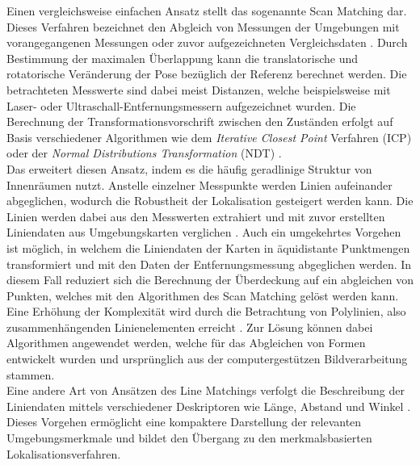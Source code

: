 Einen vergleichsweise einfachen Ansatz stellt das sogenannte Scan Matching  dar. Dieses Verfahren bezeichnet den Abgleich \red[(Matching)] von Messungen der Umgebungen mit vorangegangenen Messungen \cite{Gutmann1996} oder zuvor aufgezeichneten Vergleichsdaten \cite{Gutmann1998}. Durch Bestimmung der maximalen Überlappung kann die translatorische und rotatorische Veränderung der Pose bezüglich der Referenz berechnet werden. Die betrachteten Messwerte sind dabei meist Distanzen, welche beispielsweise mit Laser- \cite{Diosi2007} oder Ultraschall-Entfernungsmessern \cite{Burguera2005} aufgezeichnet wurden. Die Berechnung der Transformationsvorschrift zwischen den Zuständen erfolgt auf Basis verschiedener Algorithmen wie dem \textit{Iterative Closest Point} Verfahren (ICP) \cite{Besl1992}\cite{Lu1994} oder der \textit{Normal Distributions Transformation} (NDT) \cite{Biber2003}.\\

Das  erweitert diesen Ansatz, indem es die häufig geradlinige Struktur von Innenräumen nutzt. Anstelle einzelner Messpunkte werden Linien aufeinander abgeglichen, wodurch die Robustheit der Lokalisation gesteigert werden kann. Die Linien werden dabei aus den Messwerten extrahiert und mit zuvor erstellten Liniendaten aus Umgebungskarten verglichen \cite{Cox1991}\cite{Gutmann1999}. Auch ein umgekehrtes Vorgehen ist möglich, in welchem die Liniendaten der Karten in äquidistante Punktmengen transformiert und mit den Daten der Entfernungsmessung abgeglichen werden. In diesem Fall reduziert sich die Berechnung der Überdeckung auf ein abgleichen von Punkten, welches mit den Algorithmen des Scan Matching gelöst werden kann.\\
Eine Erhöhung der Komplexität wird durch die Betrachtung von Polylinien, also zusammenhängenden Linienelementen erreicht \cite{Wolter2004}. Zur Lösung können dabei Algorithmen angewendet werden, welche für das Abgleichen von Formen entwickelt wurden und ursprünglich aus der computergestützen Bildverarbeitung stammen.\\
Eine andere Art von Ansätzen des Line Matchings verfolgt die Beschreibung der Liniendaten mittels verschiedener Deskriptoren wie Länge, Abstand und Winkel \cite{Frey2014} \cite{Garulli2005}. Dieses Vorgehen ermöglicht eine kompaktere Darstellung der relevanten Umgebungsmerkmale und bildet den Übergang zu den merkmalsbasierten Lokalisationsverfahren.\\

